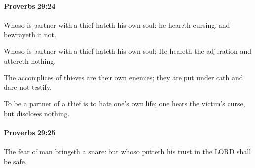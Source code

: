 		\paragraph{Proverbs 29:24} %
			\label{PROVERBS-29-24}

			Whoso is partner with a thief hateth his own soul: he heareth cursing, and bewrayeth it not.

			\begin{versebox}
					\item[BHS] 
					\item[ASV] Whoso is partner with a thief hateth his own soul; He heareth the adjuration and uttereth nothing.
					\item[NIV] The accomplices of thieves are their own enemies; they are put under oath and dare not testify.
					\item[NRSV] To be a partner of a thief is to hate one’s own life; one hears the victim’s curse, but discloses nothing.
			\end{versebox}

		\paragraph{Proverbs 29:25} %
			\label{PROVERBS-29-25}

			The fear of man bringeth a snare: but whoso putteth his trust in the LORD shall be safe.

